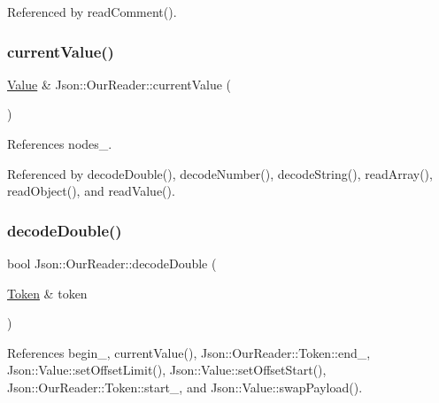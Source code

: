 Referenced by read\+Comment().

\mbox{\label{classJson_1_1OurReader_a2acd5b1d53e7d7e17c21ff8e96edc09d_a2acd5b1d53e7d7e17c21ff8e96edc09d}} 
\subsubsection{\texorpdfstring{current\+Value()}{currentValue()}}
{\footnotesize\ttfamily \hyperlink{classJson_1_1Value}{Value} \& Json\+::\+Our\+Reader\+::current\+Value (\begin{DoxyParamCaption}{ }\end{DoxyParamCaption})\hspace{0.3cm}{\ttfamily [private]}}



References nodes\+\_\+.



Referenced by decode\+Double(), decode\+Number(), decode\+String(), read\+Array(), read\+Object(), and read\+Value().

\mbox{\label{classJson_1_1OurReader_a1d1c3b44f6720a0e7c39b5ae8de3981c_a1d1c3b44f6720a0e7c39b5ae8de3981c}} 
\subsubsection{\texorpdfstring{decode\+Double()}{decodeDouble()}\hspace{0.1cm}{\footnotesize\ttfamily [1/2]}}
{\footnotesize\ttfamily bool Json\+::\+Our\+Reader\+::decode\+Double (\begin{DoxyParamCaption}\item[{\hyperlink{classJson_1_1OurReader_1_1Token}{Token} \&}]{token }\end{DoxyParamCaption})\hspace{0.3cm}{\ttfamily [private]}}



References begin\+\_\+, current\+Value(), Json\+::\+Our\+Reader\+::\+Token\+::end\+\_\+, Json\+::\+Value\+::set\+Offset\+Limit(), Json\+::\+Value\+::set\+Offset\+Start(), Json\+::\+Our\+Reader\+::\+Token\+::start\+\_\+, and Json\+::\+Value\+::swap\+Payload().



